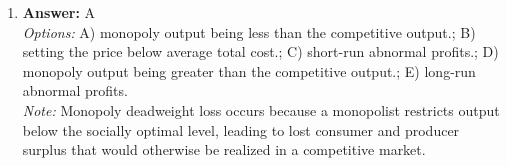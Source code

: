 \documentclass[12pt]{article}
\begin{document}
\begin{enumerate}[label=\arabic*.]
\\ \textit{Note:} The correct answer is based on the concept that a price ceiling set above the equilibrium price does not affect the market price or quantity supplied, allowing corn to maintain its status as a normal good rather than a luxury good.
\item \textbf{Answer:} A
\\ \textit{Options:} A) monopoly output being less than the competitive output.; B) setting the price below average total cost.; C) short-run abnormal profits.; D) monopoly output being greater than the competitive output.; E) long-run abnormal profits.
\\ \textit{Note:} Monopoly deadweight loss occurs because a monopolist restricts output below the socially optimal level, leading to lost consumer and producer surplus that would otherwise be realized in a competitive market.
\end{enumerate}
\end{document}
